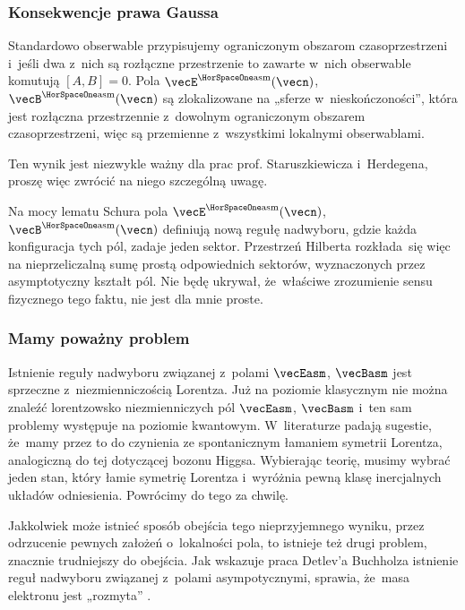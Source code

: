 \documentclass[10pt,t]{beamer}
\begin{document}
\begin{frame}
  \frametitle{Konsekwencje prawa Gaussa}


  Standardowo obserwable przypisujemy ograniczonym obszarom
  czasoprzestrzeni i~jeśli dwa z~nich są rozłączne przestrzenie to zawarte
  w~nich obserwable komutują $[ A, B ] = 0$. Pola
  $\vecE^{ \HorSpaceOne \text{asm} }( \vecn )$,
  $\vecB^{ \HorSpaceOne \text{asm} }( \vecn )$ są zlokalizowane na „sferze
  w~nieskończoności”, która jest rozłączna przestrzennie z~dowolnym
  ograniczonym obszarem czasoprzestrzeni, więc są przemienne z~wszystkimi
  lokalnymi obserwablami.

  Ten wynik jest niezwykle ważny dla prac prof. Staruszkiewicza i~Herdegena,
  proszę więc zwrócić na niego szczególną uwagę.

  Na mocy lematu Schura pola $\vecE^{ \HorSpaceOne \text{asm} }( \vecn )$,
  $\vecB^{ \HorSpaceOne \text{asm} }( \vecn )$ definiują nową regułę
  nadwyboru, gdzie każda konfiguracja tych pól, zadaje jeden sektor.
  Przestrzeń Hilberta rozkłada~się więc na \alert{nieprzeliczalną} sumę
  prostą odpowiednich sektorów, wyznaczonych przez asymptotyczny kształt
  pól. Nie będę ukrywał, że~właściwe zrozumienie sensu fizycznego tego
  faktu, nie jest dla mnie proste.

\end{frame}





\begin{frame}
  \frametitle{Mamy poważny problem}


  Istnienie reguły nadwyboru związanej z~polami $\vecEasm$, $\vecBasm$ jest
  \alert{sprzeczne} z~niezmienniczością Lorentza. Już na poziomie klasycznym
  nie można znaleźć lorentzowsko niezmienniczych pól $\vecEasm$, $\vecBasm$
  i~ten sam problemy występuje na poziomie kwantowym. W~literaturze padają
  sugestie, że~mamy przez to do czynienia ze spontanicznym łamaniem
  symetrii Lorentza, analogiczną do tej dotyczącej bozonu Higgsa.
  Wybierając teorię, musimy wybrać jeden stan, który łamie symetrię
  Lorentza i~wyróżnia pewną klasę inercjalnych układów odniesienia.
  Powrócimy do tego za chwilę.

  Jakkolwiek może istnieć sposób obejścia tego nieprzyjemnego wyniku,
  przez odrzucenie pewnych założeń o~lokalności pola, to istnieje też drugi
  problem, znacznie trudniejszy do obejścia. Jak wskazuje praca Detlev’a
  Buchholza istnienie reguł nadwyboru związanej z~polami asympotycznymi,
  sprawia, że~masa elektronu jest „rozmyta”
  \parencite{Buchholz-The-Physical-State-Space-Of-Quantum-ETC-Pub-1982}.

\end{frame}
\end{document}
